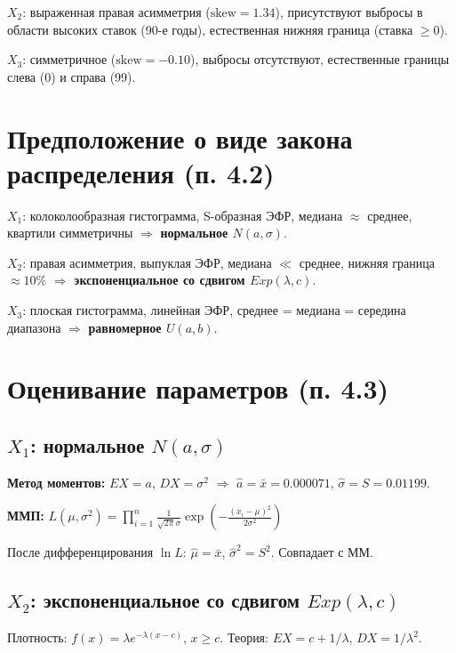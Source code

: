 \documentclass[12pt, a4paper]{article}
\begin{document}
\textbf{$X_2$}: выраженная правая асимметрия ($\text{skew} = 1.34$), присутствуют выбросы в области высоких ставок (90-е годы), естественная нижняя граница (ставка $\geq 0$).

\textbf{$X_3$}: симметричное ($\text{skew} = -0.10$), выбросы отсутствуют, естественные границы слева (0) и справа (99).

\section{Предположение о виде закона распределения (п. 4.2)}

$X_1$: колоколообразная гистограмма, S-образная ЭФР, медиана $\approx$ среднее, квартили симметричны $\Rightarrow$ \textbf{нормальное $N(a, \sigma)$}.

$X_2$: правая асимметрия, выпуклая ЭФР, медиана $\ll$ среднее, нижняя граница $\approx 10\%$ $\Rightarrow$ \textbf{экспоненциальное со сдвигом $Exp(\lambda, c)$}.

$X_3$: плоская гистограмма, линейная ЭФР, среднее = медиана = середина диапазона $\Rightarrow$ \textbf{равномерное $U(a, b)$}.

\section{Оценивание параметров (п. 4.3)}

\subsection{$X_1$: нормальное $N(a, \sigma)$}

\textbf{Метод моментов:} $EX = a$, $DX = \sigma^2$ $\Rightarrow$ $\hat a = \bar x = 0.000071$, $\hat\sigma = S = 0.01199$.

\textbf{ММП:} $L(\mu, \sigma^2) = \prod_{i=1}^{n} \frac{1}{\sqrt{2\pi}\sigma} \exp\left(-\frac{(x_i - \mu)^2}{2\sigma^2}\right)$

После дифференцирования $\ln L$: $\hat\mu = \bar x$, $\hat\sigma^2 = S^2$. Совпадает с ММ.

\subsection{$X_2$: экспоненциальное со сдвигом $Exp(\lambda, c)$}

Плотность: $f(x) = \lambda e^{-\lambda(x-c)}$, $x \geq c$. Теория: $EX = c + 1/\lambda$, $DX = 1/\lambda^2$.
\end{document}
